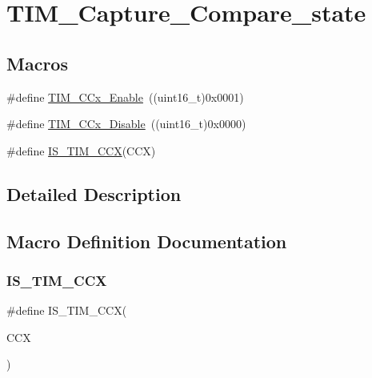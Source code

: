 \hypertarget{group___t_i_m___capture___compare__state}{}\section{T\+I\+M\+\_\+\+Capture\+\_\+\+Compare\+\_\+state}
\label{group___t_i_m___capture___compare__state}
\subsection*{Macros}
\begin{DoxyCompactItemize}
\item 
\#define \mbox{\hyperlink{group___t_i_m___capture___compare__state_ga6acaeb60dad50ce9799ae9f62ed7719a}{T\+I\+M\+\_\+\+C\+Cx\+\_\+\+Enable}}~((uint16\+\_\+t)0x0001)
\item 
\#define \mbox{\hyperlink{group___t_i_m___capture___compare__state_gaa1441f66393b9daa9f97efb29b364cd3}{T\+I\+M\+\_\+\+C\+Cx\+\_\+\+Disable}}~((uint16\+\_\+t)0x0000)
\item 
\#define \mbox{\hyperlink{group___t_i_m___capture___compare__state_ga5b7461e8c9c25f6fa082118c95b02ba1}{I\+S\+\_\+\+T\+I\+M\+\_\+\+C\+CX}}(C\+CX)
\end{DoxyCompactItemize}


\subsection{Detailed Description}


\subsection{Macro Definition Documentation}
\mbox{\label{group___t_i_m___capture___compare__state_ga5b7461e8c9c25f6fa082118c95b02ba1}} 
\subsubsection{\texorpdfstring{IS\_TIM\_CCX}{IS\_TIM\_CCX}}
{\footnotesize\ttfamily \#define I\+S\+\_\+\+T\+I\+M\+\_\+\+C\+CX(\begin{DoxyParamCaption}\item[{}]{C\+CX }\end{DoxyParamCaption})}


